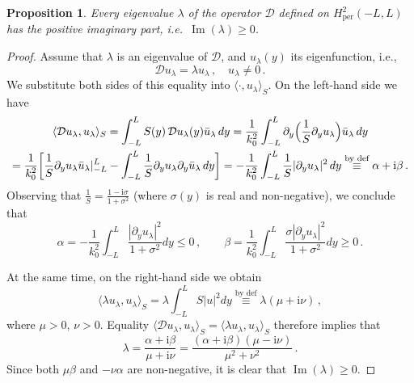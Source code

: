 \documentclass[11pt,a4paper]{article}
\newcommand{\iu}{\mathrm{i}} %
\newcommand{\cD}{\mathcal{D}}
\DeclareMathOperator{\Imag}{Im}
\theoremstyle{plain}%
\newtheorem{proposition}[thm]{Proposition}
\theoremstyle{definition}
\theoremstyle{remark}
\begin{document}
\begin{proposition}\label{prop:eigenval}
    Every eigenvalue $\lambda$ of the operator $\cD$ defined on $H^2_{\mathrm{per}}(-L,L)$ has the positive imaginary part, i.e.\ $\Imag(\lambda)\ge 0$.
\end{proposition}
\begin{proof}
    Assume that $\lambda$ is an eigenvalue of $\cD$, and $u_{\lambda}(y)$ its %
    eigenfunction, i.e.,
    \begin{equation*} 
    \cD u_{\lambda} = \lambda u_{\lambda}\,, \quad u_{\lambda} \neq 0\,.
    \end{equation*}
    We substitute both sides of this equality into $\langle\cdot, u_{\lambda} \rangle_S$. 
    On the left-hand side we have
    \begin{multline*}
    \langle \cD u_{\lambda},u_{\lambda}\rangle_S 
    = \int_{-L}^L S(y)\,\cD u_{\lambda}(y) \bar{u}_{\lambda} \,dy 
    = \frac{1}{k_0^2} \int_{-L}^L \partial_y \Bigl(\frac{1}{S} \partial_y u_{\lambda}\Bigr) \bar{u}_{\lambda} \,dy \\ 
    =\frac{1}{k_0^2}\biggl[\frac{1}{S}\partial_y u_{\lambda} \bar{u}_{\lambda} |_{-L}^L - \int_{-L}^L \frac{1}{S}\partial_y u_{\lambda} \partial_y \bar{u}_{\lambda} \,dy \biggr] 
    = -\frac{1}{k_0^2}\int_{-L}^L \frac{1}{S} |\partial_y u_{\lambda}|^2 \,dy 
    \overset{\text{by def}}{\equiv} \alpha + \iu\beta\,.     
    \end{multline*}
    Observing that $\frac{1}{S} = \frac{1 - \iu\sigma}{1+\sigma^2}$ (where $\sigma(y)$ is real and non-negative), we conclude that 
    \begin{equation*} 
    \alpha =  -\frac{1}{k_0^2}\int_{-L}^L \frac{|\partial_y u_{\lambda}|^2}{1+\sigma^2}  dy \le 0\,, \qquad 
    \beta =  \frac{1}{k_0^2}\int_{-L}^L \frac{\sigma |\partial_y u_{\lambda}|^2}{1+\sigma^2}  dy \ge 0\,. 
    \end{equation*}

    At the same time, on the right-hand side we obtain
    \begin{equation*} 
    \langle \lambda u_{\lambda}, u_{\lambda} \rangle_S = \lambda \int_{-L}^L S |u|^2 dy \overset{\text{by def}}{\equiv} \lambda (\mu + \iu\nu)\,,
    \end{equation*}
    where $\mu >0$, $\nu >0$. Equality $\langle \cD u_{\lambda}, u_{\lambda} \rangle_S = \langle \lambda u_{\lambda}, u_{\lambda} \rangle_S$ therefore implies that
    \begin{equation*} 
    \lambda = \frac{\alpha + \iu \beta}{\mu + \iu\nu } = \frac{(\alpha + \iu \beta)(\mu - \iu\nu)}{\mu^2 + \nu^2 }\,.
    \end{equation*}
    Since both $\mu\beta$ and $-\nu\alpha$ are non-negative, it is clear that $\Imag(\lambda)\ge 0$.
\end{proof}
\end{document}
